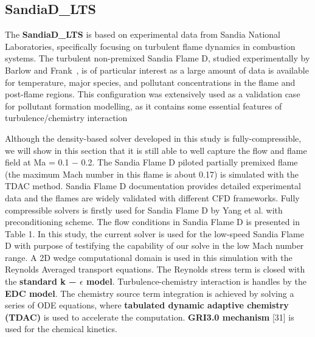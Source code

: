\subsection{SandiaD\_LTS}
The \textbf{SandiaD\_LTS} is based on experimental data from Sandia National Laboratories, specifically focusing on turbulent flame dynamics in combustion systems. The turbulent non-premixed Sandia Flame D, studied experimentally by Barlow and Frank~\cite{barlow2005piloted}, is of particular interest as a large amount of data is available for temperature, major species, and pollutant concentrations in the flame and post-flame regions. This configuration was extensively used as a validation case for pollutant formation modelling, as it contains some essential features of turbulence/chemistry interaction

Although the density-based solver developed in this study is fully-compressible, we will show in this section that it is still able to well capture the flow and flame field at Ma = 0.1 − 0.2. The Sandia Flame D piloted partially premixed flame (the maximum Mach number in this flame is about 0.17) is simulated with the TDAC method. Sandia Flame D documentation provides detailed experimental data and the flames are widely validated with different CFD frameworks. Fully compressible solvers is firstly used for Sandia Flame D by Yang et al. with preconditioning scheme. The flow conditions in Sandia Flame D is presented in Table 1. In this study, the current solver is used for the low-speed Sandia Flame D with purpose of testifying the capability of our solve in the low Mach number range. A 2D wedge computational domain is used in this simulation with the Reynolds Averaged transport equations. The Reynolds stress term is closed with the \textbf{standard k − $\epsilon$ model}. Turbulence-chemistry interaction is handles by the \textbf{EDC model}. The chemistry source term integration is achieved
by solving a series of ODE equations, where \textbf{tabulated dynamic adaptive chemistry (TDAC)} is used to accelerate the computation. \textbf{GRI3.0 mechanism} [31] is used for the chemical kinetics.

